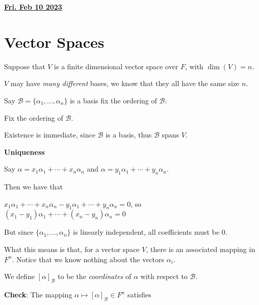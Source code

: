 \documentclass[12pt]{article}
\renewcommand{\date}[1]{\underline{\bf #1}}
\def\B{\mathcal B}
\begin{document}

  \tableofcontents
  
  \newpage

  \date{Fri. Feb 10 2023}

  \section{Vector Spaces}

  Suppose that $V$ is a finite dimensional vector space over $F$, with $\dim(V)
  = n$.

  $V$ may have {\it many different} bases, we know that they all have the same
  size $n$.

  Say $\B = \{\alpha_1, ..., \alpha_n\}$ is a basis fix the ordering of $\B$.

  Fix the ordering of $\B$.

  {
    Existence is immediate, since $\B$ is a basis, thus $\B$ spans $V$.

    {\bf Uniqueness}

    Say $\alpha = x_1 \alpha_1 + \cdots + x_n \alpha_n$
    and $\alpha = y_1 \alpha_1 + \cdots + y_n \alpha_n$.

    Then we have that

    $x_1 \alpha_1 + \cdots + x_n \alpha_n - y_1 \alpha_1 + \cdots + y_n \alpha_n
    = 0$, so $(x_1 - y_1)\alpha_1 + \cdots + (x_n - y_n)\alpha_n = 0$

    But since $\{\alpha_1, ..., \alpha_n\}$ is linearly independent, all
    coefficients must be $0$.
  }

  What this means is that, for a vector space $V$, there is an associated
  mapping in $F^n$. Notice that we know nothing about the vectors $\alpha_i$.

  We define $[\alpha]_{\B}$ to be the {\it coordinates} of $\alpha$ with
  respect to $\B$.

  {\bf Check}: The mapping $\alpha \mapsto [\alpha]_{\B} \in F^n$ satisfies
\end{document}
